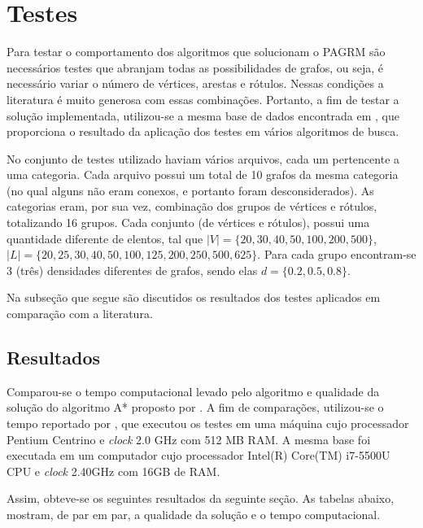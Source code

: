 \documentclass[12pt]{article}
\begin{document}
\section{Testes}\label{sec:testes}
	
	Para testar o comportamento dos algoritmos que solucionam o PAGRM são necessários testes que abranjam todas as possibilidades de grafos, ou seja, é necessário variar o número de vértices, arestas e rótulos. Nessas condições a literatura é muito generosa com essas combinações. Portanto, a fim de testar a solução implementada, utilizou-se a mesma base de dados encontrada em \cite{cerulli:2005}, que proporciona o resultado da aplicação dos testes em vários algoritmos de busca.

	No conjunto de testes utilizado haviam vários arquivos, cada um pertencente a uma categoria. Cada arquivo possui um total de 10 grafos da mesma categoria (no qual alguns não eram conexos, e portanto foram desconsiderados). As categorias eram, por sua vez, combinação dos grupos de vértices e rótulos, totalizando 16 grupos. Cada conjunto (de vértices e rótulos), possui uma quantidade diferente de elentos, tal que $|V| = \{20, 30, 40, 50, 100, 200, 500\}$, $|L| = \{20, 25, 30, 40, 50, 100, 125, 200, 250, 500, 625\}$. Para cada grupo encontram-se 3 (três) densidades diferentes de grafos, sendo elas $d = \{0.2, 0.5, 0.8\}$.

	Na subseção que segue são discutidos os resultados dos testes aplicados em comparação com a literatura.

	\subsection{Resultados}\label{sec:resultados}
		
		Comparou-se o tempo computacional levado pelo algoritmo e qualidade da solução do algoritmo A* proposto por \cite{chang:1996}. A fim de comparações, utilizou-se o tempo reportado por \cite{consoli:2009}, que executou os testes em uma máquina cujo processador Pentium Centrino e \textit{clock} 2.0 GHz com 512 MB RAM. A mesma base foi executada em um computador cujo processador Intel(R) Core(TM) i7-5500U CPU e \textit{clock} 2.40GHz com 16GB de RAM.

		Assim, obteve-se os seguintes resultados da seguinte seção. As tabelas abaixo, mostram, de par em par, a qualidade da solução e o tempo computacional.
\end{document}
